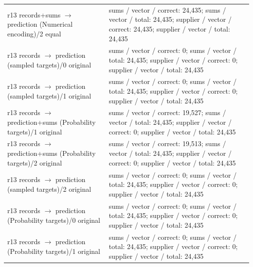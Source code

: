 \begin{longtable}{@{}>{\raggedright\arraybackslash}p{1.800in}>{\raggedright\arraybackslash}p{4.200in}@{}}
r13 records+sums $\to$ prediction (Numerical encoding)/\allowbreak{}2 equal & sums /\allowbreak{} vector /\allowbreak{} correct: 24,435; sums /\allowbreak{} vector /\allowbreak{} total: 24,435; supplier /\allowbreak{} vector /\allowbreak{} correct: 24,435; supplier /\allowbreak{} vector /\allowbreak{} total: 24,435 \\
r13 records $\to$ prediction (sampled targets)/\allowbreak{}0 original & sums /\allowbreak{} vector /\allowbreak{} correct: 0; sums /\allowbreak{} vector /\allowbreak{} total: 24,435; supplier /\allowbreak{} vector /\allowbreak{} correct: 0; supplier /\allowbreak{} vector /\allowbreak{} total: 24,435 \\
r13 records $\to$ prediction (sampled targets)/\allowbreak{}1 original & sums /\allowbreak{} vector /\allowbreak{} correct: 0; sums /\allowbreak{} vector /\allowbreak{} total: 24,435; supplier /\allowbreak{} vector /\allowbreak{} correct: 0; supplier /\allowbreak{} vector /\allowbreak{} total: 24,435 \\
r13 records $\to$ prediction+sums (Probability targets)/\allowbreak{}1 original & sums /\allowbreak{} vector /\allowbreak{} correct: 19,527; sums /\allowbreak{} vector /\allowbreak{} total: 24,435; supplier /\allowbreak{} vector /\allowbreak{} correct: 0; supplier /\allowbreak{} vector /\allowbreak{} total: 24,435 \\
r13 records $\to$ prediction+sums (Probability targets)/\allowbreak{}2 original & sums /\allowbreak{} vector /\allowbreak{} correct: 19,513; sums /\allowbreak{} vector /\allowbreak{} total: 24,435; supplier /\allowbreak{} vector /\allowbreak{} correct: 0; supplier /\allowbreak{} vector /\allowbreak{} total: 24,435 \\
r13 records $\to$ prediction (sampled targets)/\allowbreak{}2 original & sums /\allowbreak{} vector /\allowbreak{} correct: 0; sums /\allowbreak{} vector /\allowbreak{} total: 24,435; supplier /\allowbreak{} vector /\allowbreak{} correct: 0; supplier /\allowbreak{} vector /\allowbreak{} total: 24,435 \\
r13 records $\to$ prediction (Probability targets)/\allowbreak{}0 original & sums /\allowbreak{} vector /\allowbreak{} correct: 0; sums /\allowbreak{} vector /\allowbreak{} total: 24,435; supplier /\allowbreak{} vector /\allowbreak{} correct: 0; supplier /\allowbreak{} vector /\allowbreak{} total: 24,435 \\
r13 records $\to$ prediction (Probability targets)/\allowbreak{}1 original & sums /\allowbreak{} vector /\allowbreak{} correct: 0; sums /\allowbreak{} vector /\allowbreak{} total: 24,435; supplier /\allowbreak{} vector /\allowbreak{} correct: 0; supplier /\allowbreak{} vector /\allowbreak{} total: 24,435 \\

\end{longtable}
